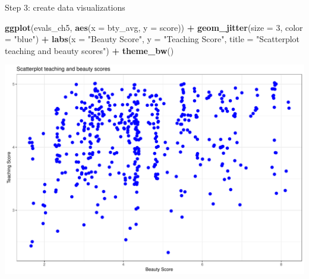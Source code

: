 \documentclass[
  ignorenonframetext,
]{beamer}
\newenvironment{Shaded}{\begin{snugshade}}{\end{snugshade}}
\newcommand{\AttributeTok}[1]{\textcolor[rgb]{0.13,0.29,0.53}{#1}}
\newcommand{\DecValTok}[1]{\textcolor[rgb]{0.00,0.00,0.81}{#1}}
\newcommand{\FunctionTok}[1]{\textcolor[rgb]{0.13,0.29,0.53}{\textbf{#1}}}
\newcommand{\NormalTok}[1]{#1}
\newcommand{\SpecialCharTok}[1]{\textcolor[rgb]{0.81,0.36,0.00}{\textbf{#1}}}
\newcommand{\StringTok}[1]{\textcolor[rgb]{0.31,0.60,0.02}{#1}}
\begin{document}
\begin{frame}[fragile]{Step 3: create data visualizations}
\protect\hypertarget{step-3-create-data-visualizations}{}
\normalsize

\begin{Shaded}
\begin{Highlighting}[]
\FunctionTok{ggplot}\NormalTok{(evals\_ch5, }\FunctionTok{aes}\NormalTok{(}\AttributeTok{x =}\NormalTok{ bty\_avg, }\AttributeTok{y =}\NormalTok{ score)) }\SpecialCharTok{+}
  \FunctionTok{geom\_jitter}\NormalTok{(}\AttributeTok{size =} \DecValTok{3}\NormalTok{, }\AttributeTok{color =} \StringTok{"blue"}\NormalTok{) }\SpecialCharTok{+}
  \FunctionTok{labs}\NormalTok{(}\AttributeTok{x =} \StringTok{"Beauty Score"}\NormalTok{, }\AttributeTok{y =} \StringTok{"Teaching Score"}\NormalTok{,}
       \AttributeTok{title =} \StringTok{"Scatterplot teaching and beauty scores"}\NormalTok{) }\SpecialCharTok{+}
  \FunctionTok{theme\_bw}\NormalTok{()}
\end{Highlighting}
\end{Shaded}

\begin{center}\includegraphics[width=0.6\linewidth,height=0.45\textheight]{Week4_Lect_files/figure-beamer/unnamed-chunk-16-1} \end{center}
\normalsize
\end{frame}
\end{document}
